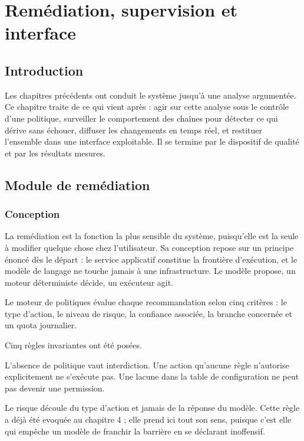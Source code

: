 \documentclass[12pt,a4paper,oneside]{report}
\begin{document}
\clearpage
\chapter{Remédiation, supervision et interface}

\section*{Introduction}

Les chapitres précédents ont conduit le système jusqu'à une analyse argumentée.
Ce chapitre traite de ce qui vient après : agir sur cette analyse sous le
contrôle d'une politique, surveiller le comportement des chaînes pour détecter ce
qui dérive sans échouer, diffuser les changements en temps réel, et restituer
l'ensemble dans une interface exploitable. Il se termine par le dispositif de
qualité et par les résultats mesures.

\section{Module de remédiation}

\subsection{Conception}

La remédiation est la fonction la plus sensible du système, puisqu'elle est la
seule à modifier quelque chose chez l'utilisateur. Sa conception repose sur un
principe énoncé dès le départ : le service applicatif constitue la frontière
d'exécution, et le modèle de langage ne touche jamais à une infrastructure. Le
modèle propose, un moteur déterministe décide, un exécuteur agit.

Le moteur de politiques évalue chaque recommandation selon cinq critères : le
type d'action, le niveau de risque, la confiance associée, la branche concernée
et un quota journalier.

Cinq règles invariantes ont été posées.

L'absence de politique vaut interdiction. Une action qu'aucune règle n'autorise
explicitement ne s'exécute pas. Une lacune dans la table de configuration ne peut
pas devenir une permission.

Le risque découle du type d'action et jamais de la réponse du modèle. Cette règle
a déjà été evoquée au chapitre 4 ; elle prend ici tout son sens, puisque c'est
elle qui empêche un modèle de franchir la barrière en se déclarant inoffensif.
\end{document}
